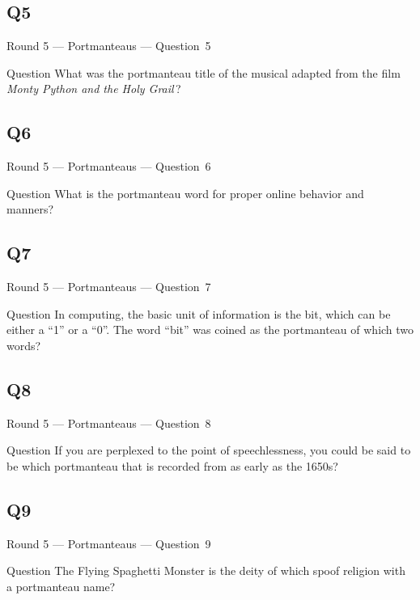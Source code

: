 \documentclass[11pt]{beamer}
\begin{document}
\subsection*{Q5}
\begin{frame}[t]{Round 5 --- Portmanteaus --- \mbox{Question 5}}
\vspace{-0.5em}
\begin{block}{Question}
What was the portmanteau title of the musical adapted from the film \emph{Monty Python and the Holy Grail}\,?
\end{block}
\end{frame}
\subsection*{Q6}
\begin{frame}[t]{Round 5 --- Portmanteaus --- \mbox{Question 6}}
\vspace{-0.5em}
\begin{block}{Question}
What is the portmanteau word for proper online behavior and manners?
\end{block}
\end{frame}
\subsection*{Q7}
\begin{frame}[t]{Round 5 --- Portmanteaus --- \mbox{Question 7}}
\vspace{-0.5em}
\begin{block}{Question}
In computing, the basic unit of information is the bit, which can be either a ``1'' or a ``0''. The word ``bit'' was coined as the portmanteau of which two words?
\end{block}
\end{frame}
\subsection*{Q8}
\begin{frame}[t]{Round 5 --- Portmanteaus --- \mbox{Question 8}}
\vspace{-0.5em}
\begin{block}{Question}
If you are perplexed to the point of speechlessness, you could be said to be which portmanteau that is recorded from as early as the 1650s?
\end{block}
\end{frame}
\subsection*{Q9}
\begin{frame}[t]{Round 5 --- Portmanteaus --- \mbox{Question 9}}
\vspace{-0.5em}
\begin{block}{Question}
The Flying Spaghetti Monster is the deity of which spoof religion with a portmanteau name?
\end{block}
\end{frame}
\end{document}
